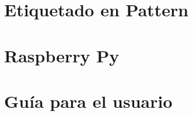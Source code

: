 \chapter{Etiquetado en Pattern} \label{ap:patt}


\chapter{Raspberry Py} \label{ap:rasp}


\chapter{Guía para el usuario} \label{ap:guia}
